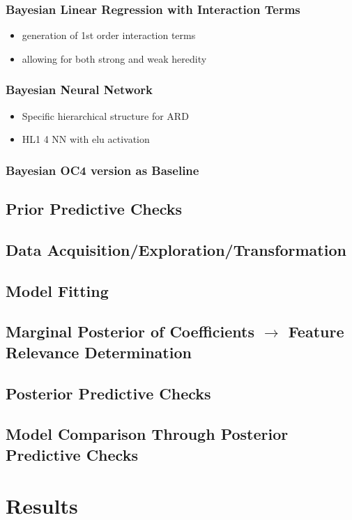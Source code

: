 \documentclass[10pt]{article}
\begin{document}
		\subsubsection{Bayesian Linear Regression with Interaction Terms}
			\begin{itemize}
				\item generation of 1st order interaction terms
				\item allowing for both strong and weak heredity
			\end{itemize}
		\subsubsection{Bayesian Neural Network}
			\begin{itemize}
				\item Specific hierarchical structure for ARD
				\item HL1 4 NN with elu activation
			\end{itemize}
		\subsubsection{Bayesian OC4 version as Baseline}
	
	\subsection{Prior Predictive Checks}
	
	\subsection{Data Acquisition/Exploration/Transformation}
	
	\subsection{Model Fitting}
	
	\subsection{Marginal Posterior of Coefficients $\rightarrow$ Feature Relevance Determination}	
	
	\subsection{Posterior Predictive Checks}
	
	\subsection{Model Comparison Through Posterior Predictive Checks}
	

\section{Results}





	
\end{document}

